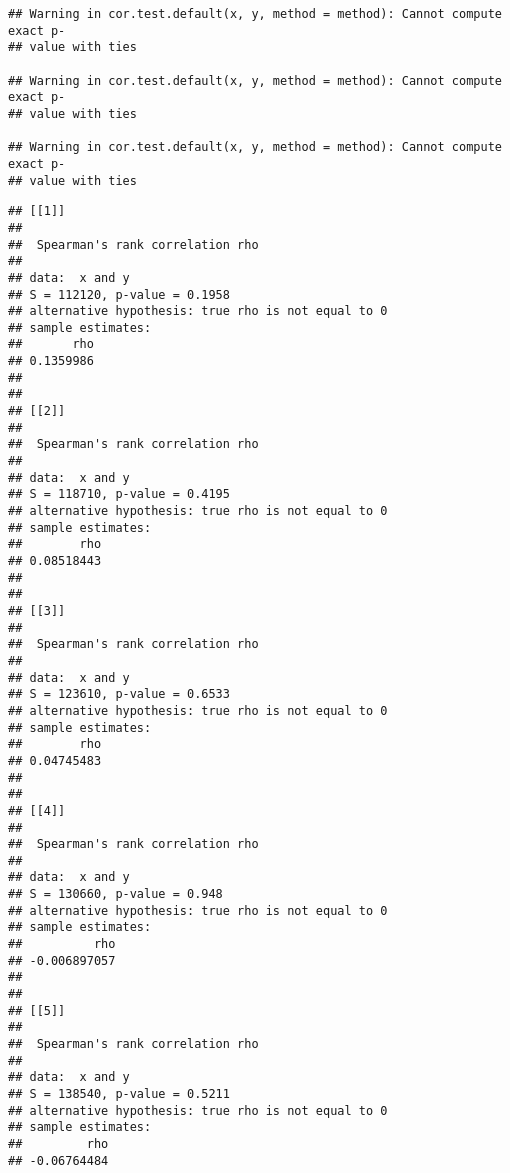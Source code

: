 \documentclass[]{article}
\begin{document}
\begin{verbatim}
## Warning in cor.test.default(x, y, method = method): Cannot compute exact p-
## value with ties

## Warning in cor.test.default(x, y, method = method): Cannot compute exact p-
## value with ties

## Warning in cor.test.default(x, y, method = method): Cannot compute exact p-
## value with ties
\end{verbatim}

\begin{verbatim}
## [[1]]
## 
##  Spearman's rank correlation rho
## 
## data:  x and y
## S = 112120, p-value = 0.1958
## alternative hypothesis: true rho is not equal to 0
## sample estimates:
##       rho 
## 0.1359986 
## 
## 
## [[2]]
## 
##  Spearman's rank correlation rho
## 
## data:  x and y
## S = 118710, p-value = 0.4195
## alternative hypothesis: true rho is not equal to 0
## sample estimates:
##        rho 
## 0.08518443 
## 
## 
## [[3]]
## 
##  Spearman's rank correlation rho
## 
## data:  x and y
## S = 123610, p-value = 0.6533
## alternative hypothesis: true rho is not equal to 0
## sample estimates:
##        rho 
## 0.04745483 
## 
## 
## [[4]]
## 
##  Spearman's rank correlation rho
## 
## data:  x and y
## S = 130660, p-value = 0.948
## alternative hypothesis: true rho is not equal to 0
## sample estimates:
##          rho 
## -0.006897057 
## 
## 
## [[5]]
## 
##  Spearman's rank correlation rho
## 
## data:  x and y
## S = 138540, p-value = 0.5211
## alternative hypothesis: true rho is not equal to 0
## sample estimates:
##         rho 
## -0.06764484
\end{verbatim}
\end{document}
